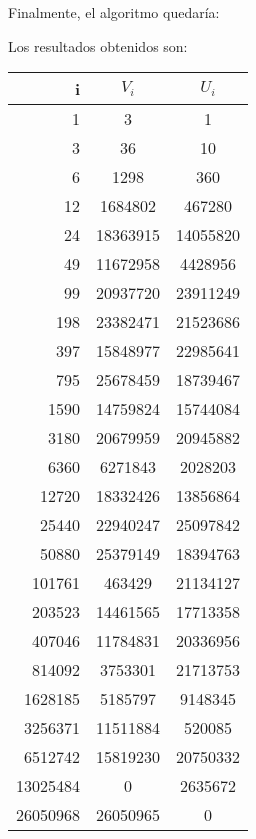 \begin{enumerate}
		Finalmente, el algoritmo quedaría:
		
		Los resultados obtenidos son:
		\begin{center}
		  \begin{tabular}{ | r | c | c |}
		    \hline
		    i	& $V_i$	& $U_i$ \\
		    \hline
			1       & 3     & 1 \\
			3       & 36    & 10 \\
			6       & 1298  & 360 \\
			12      & 1684802       & 467280 \\
			24      & 18363915      & 14055820 \\
			49      & 11672958      & 4428956 \\
			99      & 20937720      & 23911249 \\
			198     & 23382471      & 21523686 \\
			397     & 15848977      & 22985641 \\
			795     & 25678459      & 18739467 \\
			1590    & 14759824      & 15744084 \\
			3180    & 20679959      & 20945882 \\
			6360    & 6271843       & 2028203 \\
			12720   & 18332426      & 13856864 \\
			25440   & 22940247      & 25097842 \\
			50880   & 25379149      & 18394763 \\
			101761  & 463429        & 21134127 \\
			203523  & 14461565      & 17713358 \\
			407046  & 11784831      & 20336956 \\
			814092  & 3753301       & 21713753 \\
			1628185 & 5185797       & 9148345 \\
			3256371 & 11511884      & 520085 \\
			6512742 & 15819230      & 20750332 \\
			13025484        & 0     & 2635672 \\
			26050968        & 26050965      & 0 \\
		    \hline
		  \end{tabular}
		\end{center}
		
    \end{enumerate}
